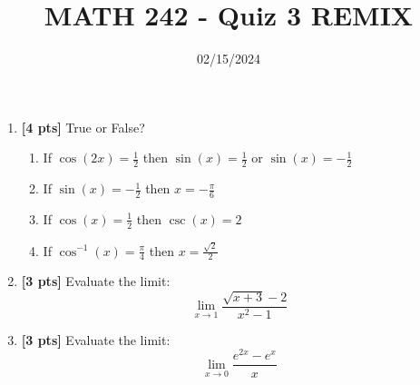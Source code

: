 \documentclass[12pt]{article}
\title{MATH 242 - Quiz 3 REMIX}
\date{02/15/2024}
\begin{document}
\maketitle


\begin{enumerate}

\item \textbf{[4 pts]} True or False?
\begin{enumerate}
    \item If $\cos(2x)=\frac{1}{2}$ then $\sin(x)=\frac{1}{2}$ or $\sin(x)=-\frac{1}{2}$ 
    \vfill
    \item If $\sin(x)=-\frac{1}{2}$ then $x=-\frac{\pi}{6}$
    \vfill
    \item If $\cos(x)=\frac{1}{2}$ then $\csc(x)=2$
    \vfill
    \item If $\cos^{-1}(x)=\frac{\pi}{4}$ then $x=\frac{\sqrt{2}}{2}$
    \vfill
\end{enumerate}

\pagebreak


\item \textbf{[3 pts]} Evaluate the limit:
$$\lim_{{x \to 1}} \frac{\sqrt{x + 3} - 2}{x^2 - 1}$$

\vfill

\item \textbf{[3 pts]} Evaluate the limit:
$$\lim_{{x \to 0}} \frac{e^{2x} - e^x}{x}$$
\vfill


\end{enumerate}
\end{document}
